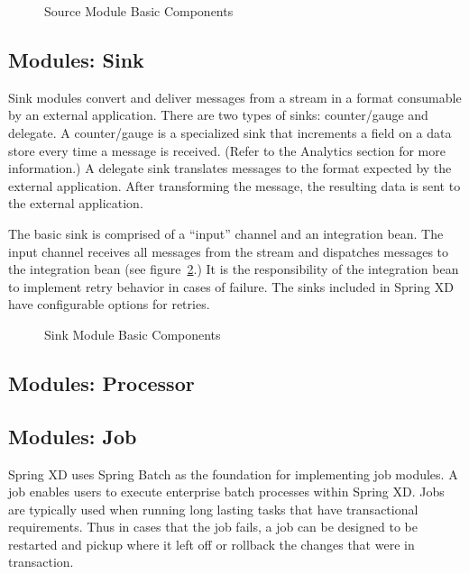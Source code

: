 \par

\begin{figure}[ht]
\centering
{}
\caption{Source Module Basic Components}
\label{fig:sourcembc}
\end{figure}

\subsection{Modules: Sink}
Sink modules convert and deliver messages from a stream in a format consumable by an external application.
There are two types of sinks: counter/gauge and delegate.
A counter/gauge is a specialized sink that increments a field on a data store every time a
message is received. (Refer to the Analytics section for more information.)  A delegate
sink translates messages to the format expected by the external application.
After transforming the message, the resulting data is sent to the external application.

\par

The basic sink is comprised of a ``input'' channel and an integration bean.
The input channel receives all messages from the stream and dispatches
messages to the integration bean (see figure~\ref{fig:sinkmbc}.) It is the responsibility of
the integration bean to implement retry behavior in cases of failure. The sinks included
in Spring XD have configurable options for retries.

\par

\begin{figure}
\centering
{}
\caption{Sink Module Basic Components}
\label{fig:sinkmbc}
\end{figure}

\subsection{Modules: Processor}

\subsection{Modules: Job}
Spring XD uses Spring Batch \cite{spring-batch-reference} as the foundation for implementing
job modules. A job enables users to execute enterprise batch processes within Spring XD.
Jobs are typically used when running long lasting tasks that have transactional requirements.
Thus in cases that the job fails, a job can be designed to be restarted and
pickup where it left off or rollback the changes that were in transaction.

